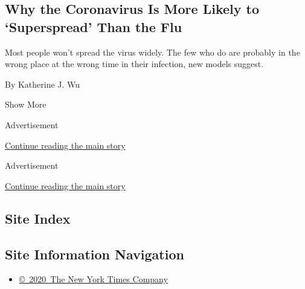 \begin{enumerate}
  \hypertarget{why-the-coronavirus-is-more-likely-to-superspread-than-the-flu}{%
  \subsection{Why the Coronavirus Is More Likely to `Superspread' Than
  the
  Flu}\label{why-the-coronavirus-is-more-likely-to-superspread-than-the-flu}}

  Most people won't spread the virus widely. The few who do are probably
  in the wrong place at the wrong time in their infection, new models
  suggest.

  By Katherine J. Wu
\end{enumerate}

Show More

Advertisement

\protect\hyperlink{after-mid4}{Continue reading the main story}

Advertisement

\protect\hyperlink{after-mktg}{Continue reading the main story}

\hypertarget{site-index}{%
\subsection{Site Index}\label{site-index}}

\hypertarget{site-information-navigation}{%
\subsection{Site Information
Navigation}\label{site-information-navigation}}

\begin{itemize}
\tightlist
\item
  \href{https://help.nytimes.com/hc/en-us/articles/115014792127-Copyright-notice}{©~2020~The
  New York Times Company}
\end{itemize}

